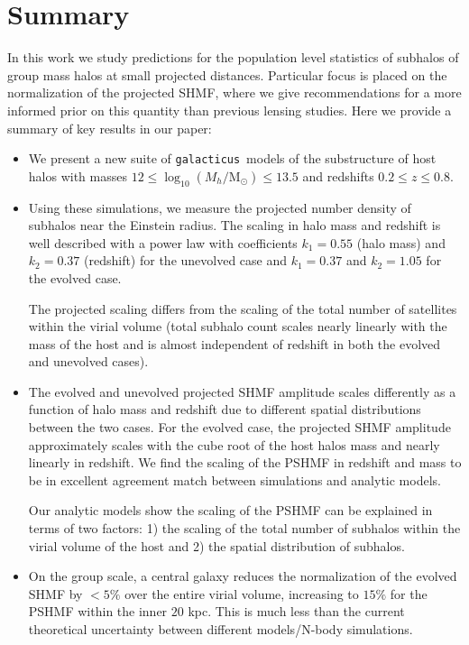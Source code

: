 \documentclass[%
 reprint,
 amsmath,
 amssymb,
 aps,
prd,
twocolumn,
superscriptaddress,
preprintnumbers,
floatfix,
nofootinbib
]{revtex4-2}
\def\gal{{\tt galacticus}~}
\begin{document}
\section{Summary}\label{sec_conclusion}
In this work we study predictions for the population level statistics of subhalos of group mass halos at small projected distances.
Particular focus is placed on the normalization of the projected SHMF, where we give recommendations for a more informed prior on this quantity than previous lensing studies. 
Here we provide a summary of key results in our paper:
\begin{itemize}
    \item
    We present a new suite of \gal models of the substructure of host halos with masses $12 \leq \log_{10}(M_{h}/\mathrm{M}_{\odot}) \leq 13.5$ and redshifts $0.2 \leq z \leq 0.8$.
    \item
    Using these simulations, we measure the projected number density of subhalos near the Einstein radius.
    The scaling in halo mass and redshift is well described with a power law with coefficients $k_{1}=0.55$ (halo mass) and $k_{2}=0.37$ (redshift) for the unevolved case and $k_{1}=0.37$ and $k_{2}=1.05$ for the evolved case.

     The projected scaling differs from the scaling of the total number of satellites within the virial volume (total subhalo count scales nearly linearly with the mass of the host and is almost independent of redshift in both the evolved and unevolved cases).      

    \item
    The evolved and unevolved projected SHMF amplitude scales differently as a function of halo mass and redshift due to different spatial distributions between the two cases. 
    For the evolved case, the projected SHMF amplitude approximately scales with the cube root of the host halos mass and nearly linearly in redshift.
    We find the scaling of the PSHMF in redshift and mass to be in excellent agreement match between simulations and analytic models.

     Our analytic models show the scaling of the PSHMF can be explained in terms of two factors: 1) the scaling of the total number of subhalos within the virial volume of the host and 2) the spatial distribution of subhalos.

    \item
    On the group scale, a central galaxy reduces the normalization of the evolved SHMF by $< 5\%$ over the entire virial volume, increasing to $15 \%$ for the PSHMF within the inner $20$ kpc.
    This is much less than the current theoretical uncertainty between different models/N-body simulations.


\end{itemize}
\end{document}
